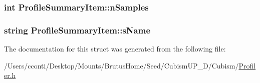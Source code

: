 \subsubsection[{n\+Samples}]{\setlength{\rightskip}{0pt plus 5cm}int Profile\+Summary\+Item\+::n\+Samples}\label{struct_profile_summary_item_adb8b4578844aaa85bd0bd7f970e23959}
\hypertarget{struct_profile_summary_item_ae37c58451ea8907b3b6580066bf48a71}{}
\subsubsection[{s\+Name}]{\setlength{\rightskip}{0pt plus 5cm}string Profile\+Summary\+Item\+::s\+Name}\label{struct_profile_summary_item_ae37c58451ea8907b3b6580066bf48a71}


The documentation for this struct was generated from the following file\+:\begin{DoxyCompactItemize}
\item 
/\+Users/cconti/\+Desktop/\+Mounts/\+Brutus\+Home/\+Seed/\+Cubism\+U\+P\+\_\+D/\+Cubism/\hyperlink{_profiler_8h}{Profiler.\+h}\end{DoxyCompactItemize}
